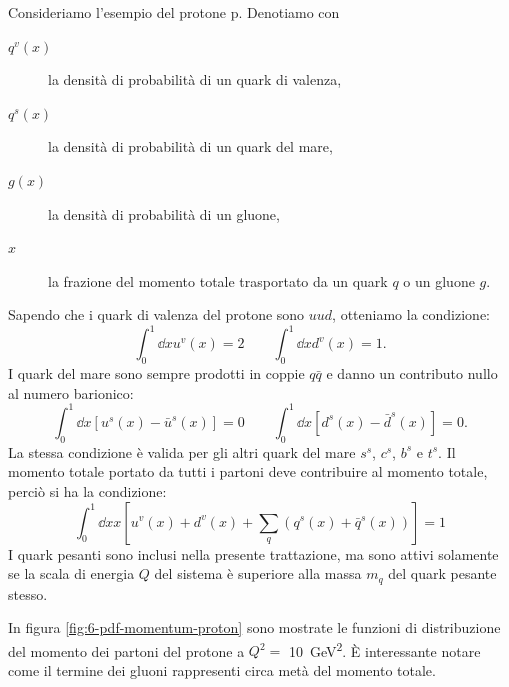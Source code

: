         Consideriamo l'esempio del protone p. Denotiamo con
        \begin{description}
            \item[$q^v(x)$] la densità di probabilità di un quark di valenza,

            \item[$q^s(x)$] la densità di probabilità di un quark del mare,

            \item[$g(x)$] la densità di probabilità di un gluone,

            \item[$x$] la frazione del momento totale trasportato da un quark $q$ o un gluone $g$.
        \end{description}
        Sapendo che i quark di valenza del protone sono $uud$, otteniamo la condizione:
        \begin{equation*}
            \int_{0}^{1}{\dd{x} u^v(x)} = 2 \qquad \int_{0}^{1}{\dd{x} d^v(x)} = 1.
        \end{equation*}
        I quark del mare sono sempre prodotti in coppie $q\bar{q}$ e danno un contributo nullo al numero barionico:
        \begin{equation*}
            \int_{0}^{1}{\dd{x} [u^s(x) - \bar{u}^s(x)]} = 0 \qquad \int_{0}^{1}{\dd{x} [d^s(x) - \bar{d}^s(x)]} = 0.
        \end{equation*}
        La stessa condizione è valida per gli altri quark del mare $s^s$, $c^s$, $b^s$ e $t^s$.
        Il momento totale portato da tutti i partoni deve contribuire al momento totale, perciò si ha la condizione:
        \begin{equation*}
            \int_{0}^{1}{\dd{x} x [u^{v}(x) + d^{v}(x) + \sum_{q} (q^{s}(x) + \bar{q}^{s}(x))]} = 1
        \end{equation*}
        I quark pesanti sono inclusi nella presente trattazione, ma sono attivi solamente se la scala di energia $Q$ del sistema è superiore alla massa $m_q$ del quark pesante stesso.

        In figura \ref{fig:6-pdf-momentum-proton} sono mostrate le funzioni di distribuzione del momento dei partoni del protone a $Q^2 =$ \qty{10}{\giga \eV^2}. È interessante notare come il termine dei gluoni rappresenti circa metà del momento totale.

